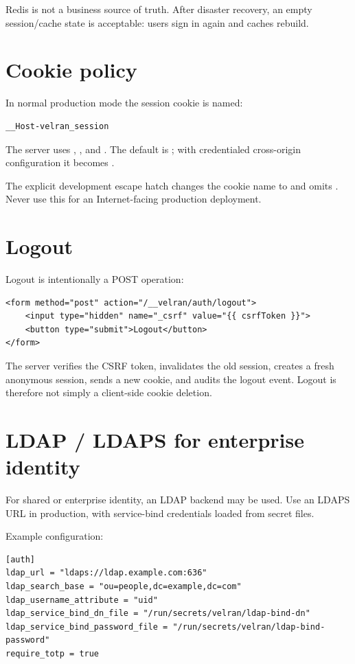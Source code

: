 Redis is not a business source of truth. After disaster recovery, an empty session/cache state is acceptable: users sign in again and caches rebuild.

\section{Cookie policy}

In normal production mode the session cookie is named:

\begin{lstlisting}
__Host-velran_session
\end{lstlisting}

The server uses , , and . The default is ; with credentialed cross-origin configuration it becomes .

The explicit development escape hatch  changes the cookie name to  and omits . Never use this for an Internet-facing production deployment.

\section{Logout}

Logout is intentionally a POST operation:

\begin{lstlisting}[language=Velran]
<form method="post" action="/__velran/auth/logout">
    <input type="hidden" name="_csrf" value="{{ csrfToken }}">
    <button type="submit">Logout</button>
</form>
\end{lstlisting}

The server verifies the CSRF token, invalidates the old session, creates a fresh anonymous session, sends a new cookie, and audits the logout event. Logout is therefore not simply a client-side cookie deletion.

\section{LDAP / LDAPS for enterprise identity}

For shared or enterprise identity, an LDAP backend may be used. Use an LDAPS URL in production, with service-bind credentials loaded from secret files.

Example configuration:

\begin{lstlisting}
[auth]
ldap_url = "ldaps://ldap.example.com:636"
ldap_search_base = "ou=people,dc=example,dc=com"
ldap_username_attribute = "uid"
ldap_service_bind_dn_file = "/run/secrets/velran/ldap-bind-dn"
ldap_service_bind_password_file = "/run/secrets/velran/ldap-bind-password"
require_totp = true
\end{lstlisting}

